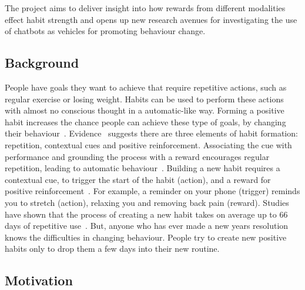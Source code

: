 The project aims to deliver insight into how rewards from different modalities effect habit strength and opens up new research avenues for investigating the use of chatbots as
vehicles for promoting behaviour change.

\subsection*{Background}
People have goals they want to achieve that require repetitive actions, such as regular exercise or losing weight.
Habits can be used to perform these actions with almost no conscious thought in a automatic-like way.
Forming a positive habit increases the chance people can achieve these type of goals, by changing their behaviour~\cite{article_promoting_habit_formation}.
Evidence~\cite{article_beyond_self_tracking_designing_apps} suggests there are three elements of habit formation: repetition, contextual cues and positive reinforcement.
Associating the cue with performance and grounding the process with a reward encourages regular repetition, leading to automatic behaviour~\cite{article_experiences_of_habit_formation}.
Building a new habit requires a contextual cue, to trigger the start of the habit (action), and a reward for
positive reinforcement~\cite{article_beyond_self_tracking_designing_apps, article_how_habits_formed_modelling_habit_formation}.
For example, a reminder on your phone (trigger) reminds you to stretch (action), relaxing you and removing back pain (reward).
Studies have shown that the process of creating a new habit takes on average up to 66 days of repetitive use~\cite{article_how_habits_formed_modelling_habit_formation}.
But, anyone who has ever made a new years resolution knows the difficulties in changing behaviour. People try to create new positive habits only to drop them a few days into their new routine.

\subsection*{Motivation}

